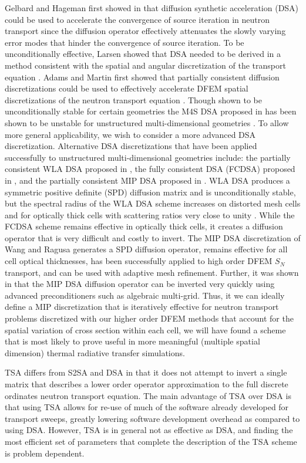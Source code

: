 Gelbard and Hageman first showed in \cite{old_dsa} that diffusion synthetic acceleration (DSA) could be used to accelerate the convergence of source iteration in neutron transport since the diffusion operator effectively attenuates the slowly varying error modes that hinder the convergence of source iteration.
To be unconditionally effective, Larsen showed that DSA needed to be derived in a method consistent with the spatial and angular discretization of the transport equation \cite{larsen_dsa}.
Adams and Martin first showed that partially consistent diffusion discretizations could be used to effectively accelerate DFEM spatial discretizations of the neutron transport equation \cite{adams_dsa}.
Though shown to be unconditionally stable for certain geometries the M4S DSA proposed in \cite{adams_dsa} has been shown to be unstable for unstructured multi-dimensional geometries \cite{wwm_dsa}.
To allow more general applicability, we wish to consider a more advanced DSA discretization.
Alternative DSA discretizations that have been applied successfully to unstructured multi-dimensional geometries include: the partially consistent WLA DSA proposed in \cite{wla_dsa}, the fully consistent DSA (FCDSA) proposed in \cite{wwm_dsa}, and the partially consistent MIP DSA proposed in \cite{mip_dsa}.
WLA DSA produces a symmetric positive definite (SPD) diffusion matrix and is unconditionally stable, but the spectral radius of the WLA DSA scheme increases on distorted mesh cells and for optically thick cells with scattering ratios very close to unity \cite{wla_dsa,wwm_dsa}.
While the FCDSA scheme remains effective in optically thick cells, it creates a diffusion operator that is very difficult and costly to invert\cite{wwm_dsa}. 
The MIP DSA discretization \cite{mip_dsa} of Wang and Ragusa generates a SPD diffusion operator, remains effective for all cell optical thicknesses, has been successfully applied to high order DFEM $S_N$ transport, and can be used with adaptive mesh refinement.
Further, it was shown in \cite{mip_mc} that the MIP DSA diffusion operator can be inverted very quickly using advanced preconditioners such as algebraic multi-grid.
Thus, it we can ideally define a MIP discretization that is iteratively effective for neutron transport problems discretized with our higher order DFEM methods that account for the spatial variation of cross section within each cell, we will have found a scheme that is most likely to prove useful in more meaningful (multiple spatial dimension) thermal radiative transfer simulations.

 TSA differs from S2SA and DSA in that it does not attempt to invert a single matrix that describes a lower order operator approximation to the full discrete ordinates neutron transport equation.
The main advantage of TSA over DSA is that using TSA allows for re-use of much of the software already developed for transport sweeps, greatly lowering software development overhead as compared to using DSA.
However, TSA is in general not as effective as DSA, and finding the most efficient set of parameters that complete the description of the TSA scheme is problem dependent.  \cite{tsa}

